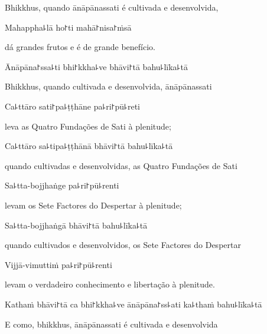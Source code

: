 \begin{english}
  Bhikkhus, quando ānāpānassati é cultivada e desenvolvida,
\end{english}

Mahappha꜕lā ho꜓ti mahā꜓nisa꜓ṁsā

\begin{english}
  dá grandes frutos e é de grande benefício.
\end{english}

Ānāpāna꜓ssa꜕ti bhi꜓kkha꜕ve bhāvi꜓tā bahu꜕līka꜕tā

\begin{english}
  Bhikkhus, quando cultivada e desenvolvida, ānāpānassati
\end{english}

Ca꜕ttāro sati꜓pa꜕ṭṭhāne pa꜕ri꜓pū꜕reti

\begin{english}
  leva as Quatro Fundações de Sati à plenitude;
\end{english}

Ca꜕ttāro sa꜕tipa꜕ṭṭhānā bhāvi꜓tā bahu꜕līka꜕tā

\begin{english}
  quando cultivadas e desenvolvidas, as Quatro Fundações de Sati
\end{english}

Sa꜕tta-bojjhaṅge pa꜕ri꜓pū꜕renti

\begin{english}
  levam os Sete Factores do Despertar à plenitude;
\end{english}

Sa꜕tta-bojjhaṅgā bhāvi꜓tā bahu꜕līka꜕tā

\begin{english}
  quando cultivados e desenvolvidos, os Sete Factores do Despertar
\end{english}

\enlargethispage{\baselineskip}

Vijjā-vimuttiṁ pa꜕ri꜓pū꜕renti

\begin{english}
  levam o verdadeiro conhecimento e libertação à plenitude.
\end{english}

Kathaṁ bhāvi꜓tā ca bhi꜓kkha꜕ve ānāpāna꜓ss꜕ati ka꜕thaṁ bahu꜕līka꜕tā

\begin{english}
  E como, bhikkhus, ānāpānassati é cultivada e desenvolvida
\end{english}

